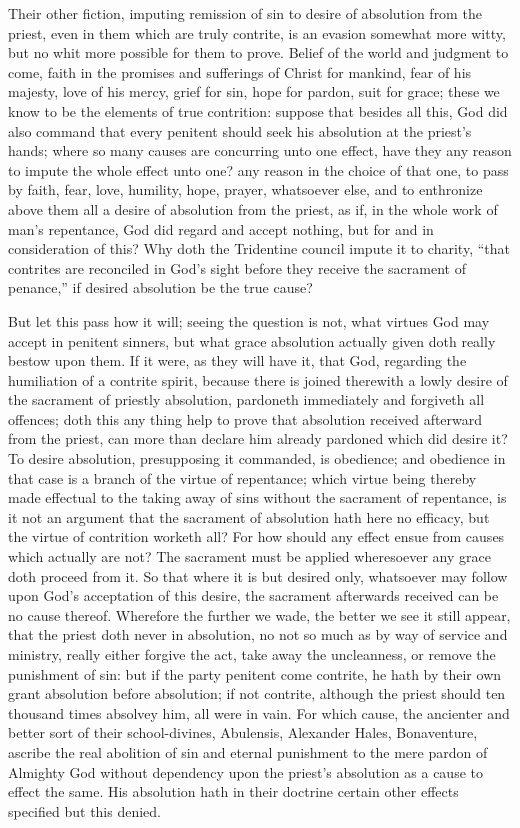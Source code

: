 Their other fiction, imputing remission of sin to desire of absolution from the priest, even in them which are truly contrite, is an evasion somewhat more witty, but no whit more possible for them to prove. Belief of the world and judgment to come, faith in the promises and sufferings of Christ for mankind, fear of his majesty, love of his mercy, grief for sin, hope for pardon, suit for grace; these we know to be the elements of true contrition: suppose that besides all this, God did also command that every penitent should seek his absolution at the priest’s hands; where so many causes are concurring unto one effect, have they any reason to impute the whole effect unto one? any reason in the choice of that one, to pass by faith, fear, love, humility, hope, prayer, whatsoever else, and to enthronize above them all a desire of absolution from the priest, as if, in the whole work of man’s repentance, God did regard and accept nothing, but for and in consideration of this? Why doth the Tridentine council impute it to charity, “that contrites are reconciled in God’s sight before they receive the sacrament of penance,” if desired absolution be the true cause?

But let this pass how it will; seeing the question is not, what virtues God may accept in penitent sinners, but what grace absolution actually given doth really bestow upon them. If it were, as they will have it, that God, regarding the humiliation of a contrite spirit, because there is joined therewith a lowly desire of the sacrament of priestly absolution, pardoneth immediately and forgiveth all offences; doth this any thing help to prove that absolution received afterward  from the priest, can more than declare him already pardoned which did desire it? To desire absolution, presupposing it commanded, is obedience; and obedience in that case is a branch of the virtue of repentance; which virtue being thereby made effectual to the taking away of sins without the sacrament of repentance, is it not an argument that the sacrament of absolution hath here no efficacy, but the virtue of contrition worketh all? For how should any effect ensue from causes which actually are not? The sacrament must be applied wheresoever any grace doth proceed from it. So that where it is but desired only, whatsoever may follow upon God’s acceptation of this desire, the sacrament afterwards received can be no cause thereof. Wherefore the further we wade, the better we see it still appear, that the priest doth never in absolution, no not so much as by way of service and ministry, really either forgive the act, take away the uncleanness, or remove the punishment of sin: but if the party penitent come contrite, he hath by their own grant absolution before absolution; if not contrite, although the priest should ten thousand times absolvey him, all were in vain. For which cause, the ancienter and better sort of their school-divines, Abulensis, Alexander Hales, Bonaventure, ascribe the real abolition of sin and eternal punishment to the mere pardon of Almighty God without dependency upon the priest’s absolution as a cause to effect the same. His absolution hath in their doctrine certain other effects specified but this denied.


